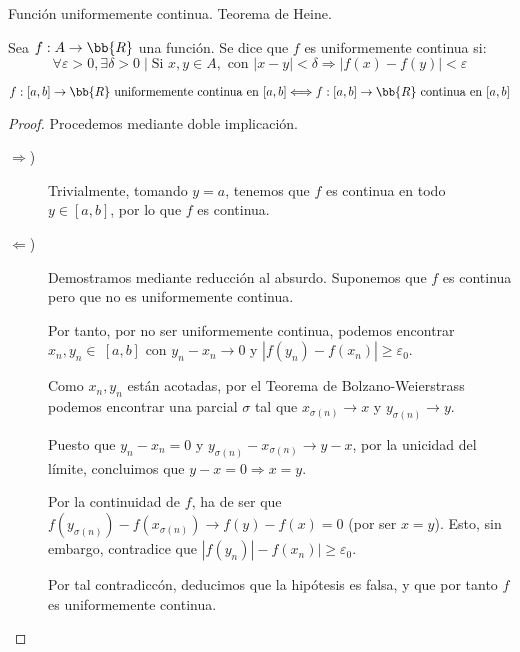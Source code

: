 \documentclass[12pt]{article}
\begin{document}
    \begin{ejercicio} Función uniformemente continua. Teorema de Heine.
\begin{definicion} 
    Sea $f:A\to \bb{R}$ una función. Se dice que $f$ es uniformemente continua si:
    \begin{equation*}
        \forall {\varepsilon} > 0, \exists \delta>0 \mid \text{Si } x,y\in A, \text{ con } |x-y|<\delta \Longrightarrow |f(x)-f(y)|<{\varepsilon}
    \end{equation*}
\end{definicion}

\begin{teo}
    \begin{equation*}
        f:[a,b]\to \bb{R} \text{ uniformemente continua en } [a,b] \Longleftrightarrow f:[a,b]\to \bb{R} \text{ continua en } [a,b] 
    \end{equation*}
    \end{teo}

    \begin{proof}
        Procedemos mediante doble implicación.
        \begin{description}
            \item [$\Longrightarrow$)]
            Trivialmente, tomando $y=a$, tenemos que $f$ es continua en todo $y\in [a,b]$, por lo que $f$ es continua.

            \item [$\Longleftarrow$)]
            Demostramos mediante reducción al absurdo. Suponemos que $f$ es continua pero que no es uniformemente continua.

            Por tanto, por no ser uniformemente continua, podemos encontrar $x_n,y_n\in~[a,b]$ con $y_n-x_n\to 0$ y $|f(y_n)-f(x_n)|\geq \varepsilon_0$.

            Como $x_n,y_n$ están acotadas, por el Teorema de Bolzano-Weierstrass podemos encontrar una parcial $\sigma$ tal que $x_{\sigma(n)}\to x$ y $y_{\sigma(n)}\to y$.

            Puesto que $y_n-x_n=0$ y $y_{\sigma(n)}-x_{\sigma(n)}\to y-x$, por la unicidad del límite, concluimos que $y-x=0\Longrightarrow x=y$.

            Por la continuidad de $f$, ha de ser que $f(y_{\sigma(n)})-f(x_{\sigma(n)})\to f(y)-f(x)=0$ (por ser $x=y$). Esto, sin embargo, contradice que $|f(y_n)|-f(x_n)|\geq \varepsilon_0$.

            Por tal contradiccón, deducimos que la hipótesis es falsa, y que por tanto $f$ es uniformemente continua.
        \end{description}
    \end{proof}
    
\end{ejercicio}
\end{document}
